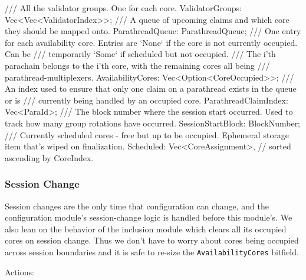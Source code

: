 \begin{verbnobox}[\small]
/// All the validator groups. One for each core.
ValidatorGroups: Vec<Vec<ValidatorIndex>>;
/// A queue of upcoming claims and which core they should be mapped onto.
ParathreadQueue: ParathreadQueue;
/// One entry for each availability core. Entries are `None` if the core is not currently occupied. Can be
/// temporarily `Some` if scheduled but not occupied.
/// The i'th parachain belongs to the i'th core, with the remaining cores all being
/// parathread-multiplexers.
AvailabilityCores: Vec<Option<CoreOccupied>>;
/// An index used to ensure that only one claim on a parathread exists in the queue or is
/// currently being handled by an occupied core.
ParathreadClaimIndex: Vec<ParaId>;
/// The block number where the session start occurred. Used to track how many group rotations have occurred.
SessionStartBlock: BlockNumber;
/// Currently scheduled cores - free but up to be occupied. Ephemeral storage item that's wiped on finalization.
Scheduled: Vec<CoreAssignment>, // sorted ascending by CoreIndex.
\end{verbnobox}

\subsubsection{Session Change}

Session changes are the only time that configuration can change, and the
configuration module's session-change logic is handled before this module's. We
also lean on the behavior of the inclusion module which clears all its occupied
cores on session change. Thus we don't have to worry about cores being occupied
across session boundaries and it is safe to re-size the \verb|AvailabilityCores|
bitfield.
\newline

Actions:


